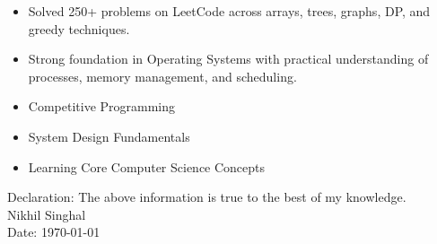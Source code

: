 \documentclass[10pt]{extarticle}
\newcommand{\yourname}{Nikhil Singhal}%
\begin{document}
\begin{contained}
\begin{itemize}
    \setlength\itemsep{2pt}
    \item Solved 250+ problems on LeetCode across arrays, trees, graphs, DP, and greedy techniques.
    \item Strong foundation in Operating Systems with practical understanding of processes, memory management, and scheduling.
\end{itemize}
\end{contained}

\begin{contained}
\begin{itemize}
    \setlength\itemsep{2pt}
    \item Competitive Programming
    \item System Design Fundamentals
    \item Learning Core Computer Science Concepts
\end{itemize}
\end{contained}

\vspace{6pt}
Declaration: The above information is true to the best of my knowledge.\\
\yourname\\
Date: \today
\end{document}
